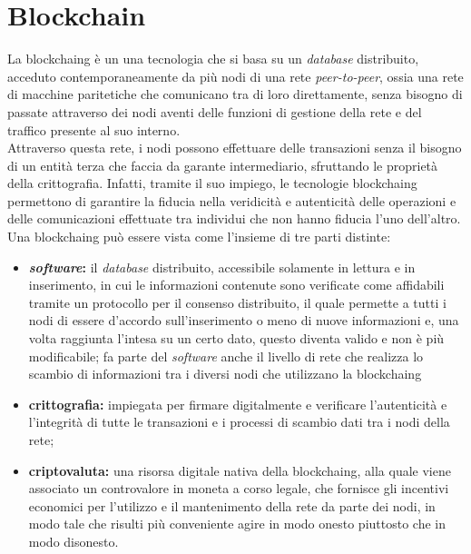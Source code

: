 
\chapter{Blockchain}
\label{cap:blockchain}

La \gls{blockchaing} è un una tecnologia che si basa su un \textit{database} distribuito, acceduto contemporaneamente da più nodi di una rete \textit{peer-to-peer}, ossia una rete di macchine paritetiche che comunicano tra di loro direttamente, senza bisogno di passate attraverso dei nodi aventi delle funzioni di gestione della rete e del traffico presente al suo interno.\\
Attraverso questa rete, i nodi possono effettuare delle transazioni senza il bisogno di un entità terza che faccia da garante intermediario, sfruttando le proprietà della crittografia. Infatti, tramite il suo impiego, le tecnologie \gls{blockchaing} permettono di garantire la fiducia nella veridicità e autenticità delle operazioni e delle comunicazioni effettuate tra individui che non hanno fiducia l'uno dell'altro.\\
Una \gls{blockchaing} può essere vista come l'insieme di tre parti distinte:

\begin{itemize}
	\item \textbf{\textit{software}:} il \textit{database} distribuito, accessibile solamente in lettura e in inserimento, in cui le informazioni contenute sono verificate come affidabili tramite un protocollo per il consenso distribuito, il quale permette a tutti i nodi di essere d'accordo sull'inserimento o meno di nuove informazioni e, una volta raggiunta l'intesa su un certo dato, questo diventa valido e non è più modificabile; fa parte del \textit{software} anche il livello di rete che realizza lo scambio di informazioni tra i diversi nodi che utilizzano la \gls{blockchaing}
	\item \textbf{crittografia:} impiegata per firmare digitalmente e verificare l'autenticità e l'integrità di tutte le transazioni e i processi di scambio dati tra i nodi della rete;
	\item \textbf{criptovaluta:} una risorsa digitale nativa della \gls{blockchaing}, alla quale viene associato un controvalore in moneta a corso legale, che fornisce gli incentivi economici per l'utilizzo e il mantenimento della rete da parte dei nodi, in modo tale che risulti più conveniente agire in modo onesto piuttosto che in modo disonesto.
\end{itemize}

